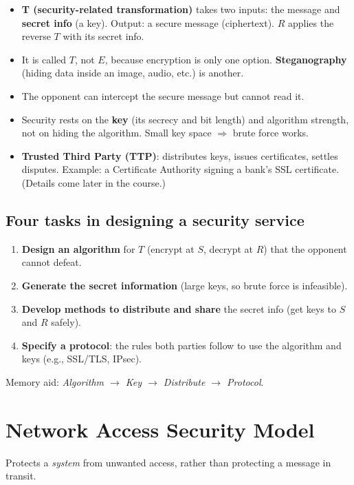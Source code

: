\documentclass[10pt,a4paper]{article}
\begin{document}
\begin{itemize}
  \item \textbf{T (security-related transformation)} takes two inputs: the message and \textbf{secret info} (a key). Output: a secure message (ciphertext). $R$ applies the reverse $T$ with its secret info.
  \item It is called $T$, not $E$, because encryption is only one option. \textbf{Steganography} (hiding data inside an image, audio, etc.) is another.
  \item The opponent can intercept the secure message but cannot read it.
  \item Security rests on the \textbf{key} (its secrecy and bit length) and algorithm strength, not on hiding the algorithm. Small key space $\Rightarrow$ brute force works.
  \item \textbf{Trusted Third Party (TTP)}: distributes keys, issues certificates, settles disputes. Example: a Certificate Authority signing a bank's SSL certificate. (Details come later in the course.)
\end{itemize}

\subsection{Four tasks in designing a security service}
\begin{keybox}
\begin{enumerate}[leftmargin=1.5em]
  \item \textbf{Design an algorithm} for $T$ (encrypt at $S$, decrypt at $R$) that the opponent cannot defeat.
  \item \textbf{Generate the secret information} (large keys, so brute force is infeasible).
  \item \textbf{Develop methods to distribute and share} the secret info (get keys to $S$ and $R$ safely).
  \item \textbf{Specify a protocol}: the rules both parties follow to use the algorithm and keys (e.g., SSL/TLS, IPsec).
\end{enumerate}
\end{keybox}
Memory aid: \emph{Algorithm $\to$ Key $\to$ Distribute $\to$ Protocol}.

\section{Network Access Security Model}

Protects a \emph{system} from unwanted access, rather than protecting a message in transit.
\end{document}
